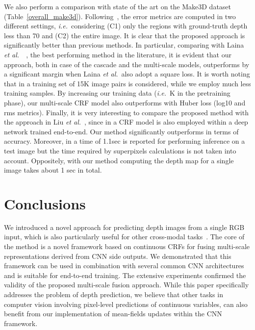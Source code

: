 \documentclass[10pt,twocolumn,letterpaper]{article}
\def\ie{\textit{i.e.}~}
\def\etal{\textit{et al.}~}
\begin{document}
We also perform a comparison with state of the art on the Make3D dataset (Table~\ref{overall_make3d}).
Following~\cite{liu2014discrete}, the error metrics are computed in two different settings, \ie considering (C1) only 
the regions with ground-truth depth less than 70 and (C2) the entire image. 
It is clear that the proposed approach is significantly better than previous methods. 
In particular, comparing with Laina \etal~\cite{laina2016deeper}, the best performing method in the literature, 
it is evident that our approach, both in case of the cascade and the multi-scale models, outperforms \cite{laina2016deeper} by a 
significant margin when Laina \etal also adopt a square loss. It is worth noting that in \cite{laina2016deeper} a 
training set of 15K image pairs is considered, while we employ much less training samples. 
By increasing our training data (\ie K in the pretraining phase), our multi-scale CRF model also outperforms \cite{laina2016deeper}
with Huber loss (log10 and rms metrics). Finally, it is very interesting to compare the proposed method with the 
approach in Liu \etal\cite{liu2015deep}, since in \cite{liu2015deep} a CRF model is also employed within a deep network trained end-to-end. 
Our method significantly outperforms \cite{liu2015deep} in terms of accuracy. Moreover, in \cite{liu2015deep} a time of 1.1sec is reported 
for performing inference on a test image but the time required by superpixels calculations is not taken into account. Oppositely, with 
our method computing the depth map for a single image takes about 1 sec in total.










%
 \vspace{-0.1cm}

\section{Conclusions}
We introduced a novel approach for predicting depth images from a single RGB input, which is also particularly useful for other cross-modal tasks~\cite{xu2013novel,xu2017cvpr}. The core of the method is a novel framework based on continuous CRFs for fusing multi-scale representations derived from CNN side outputs. 
We demonstrated that this framework can be used in combination with several common CNN architectures and is suitable for end-to-end training. The extensive experiments confirmed the validity of the proposed multi-scale fusion approach. While this paper specifically addresses the problem of depth prediction, we believe that other tasks in computer vision involving pixel-level predictions
of continuous variables, can also benefit from our implementation of mean-fields updates within the CNN framework.


{\small


}
\end{document}
